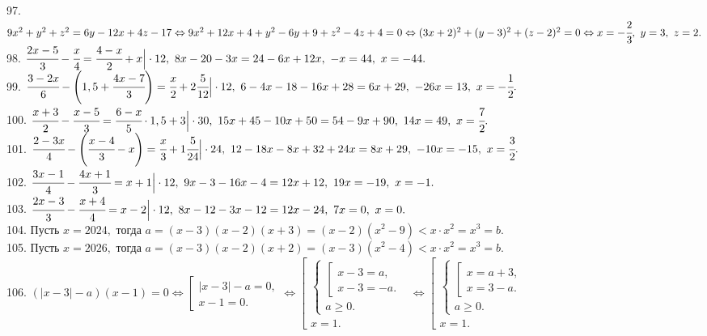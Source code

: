 \documentclass[12pt]{article}
\begin{document}
97. $9x^2+y^2+z^2=6y-12x+4z-17\Leftrightarrow9x^2+12x+4+y^2-6y+9+z^2-4z+4=0\Leftrightarrow(3x+2)^2+(y-3)^2+(z-2)^2=0\Leftrightarrow
x=-\cfrac{2}{3},\ y=3,\ z=2.$\\
98. $\cfrac{2x-5}{3}-\cfrac{x}{4}=\cfrac{4-x}{2}+x\Big|\cdot12,\ 8x-20-3x=24-6x+12x,\ -x=44,\ x=-44.$\\
99. $\cfrac{3-2x}{6}-\left(1,5+\cfrac{4x-7}{3}\right)=\cfrac{x}{2}+2\cfrac{5}{12}\Big|\cdot12,\ 6-4x-18-16x+28=6x+29,\ -26x=13,\ x=-\cfrac{1}{2}.$\\
100. $\cfrac{x+3}{2}-\cfrac{x-5}{3}=\cfrac{6-x}{5}\cdot1,5+3\Big|\cdot30,\ 15x+45-10x+50=54-9x+90,\ 14x=49,\ x=\cfrac{7}{2}.$\\
101. $\cfrac{2-3x}{4}-\left(\cfrac{x-4}{3}-x\right)=\cfrac{x}{3}+1\cfrac{5}{24}\Big|\cdot24,\ 12-18x-8x+32+24x=8x+29,\ -10x=-15,\ x=\cfrac{3}{2}.$\\
102. $\cfrac{3x-1}{4}-\cfrac{4x+1}{3}=x+1\Big|\cdot12,\ 9x-3-16x-4=12x+12,\ 19x=-19,\ x=-1.$\\
103. $\cfrac{2x-3}{3}-\cfrac{x+4}{4}=x-2\Big|\cdot12,\ 8x-12-3x-12=12x-24,\ 7x=0,\ x=0.$\\
104. Пусть $x=2024,$ тогда $a=(x-3)(x-2)(x+3)=(x-2)(x^2-9)<x\cdot x^2=x^3=b.$\\
105. Пусть $x=2026,$ тогда $a=(x-3)(x-2)(x+2)=(x-3)(x^2-4)<x\cdot x^2=x^3=b.$\\
106. $(|x-3|-a)(x-1)=0\Leftrightarrow \left[\begin{array}{l}|x-3|-a=0,\\ x-1=0.\end{array}\right.\Leftrightarrow
\left[\begin{array}{l}
\begin{cases}
\left[\begin{array}{l}
x-3=a,\\
x-3=-a.
\end{array}\right.\\
a\geqslant0.
\end{cases}\\
x=1.
\end{array}\right.\Leftrightarrow
\left[\begin{array}{l}
\begin{cases}
\left[\begin{array}{l}
x=a+3,\\
x=3-a.
\end{array}\right.\\
a\geqslant0.
\end{cases}\\
x=1.
\end{array}\right.$
\end{document}
